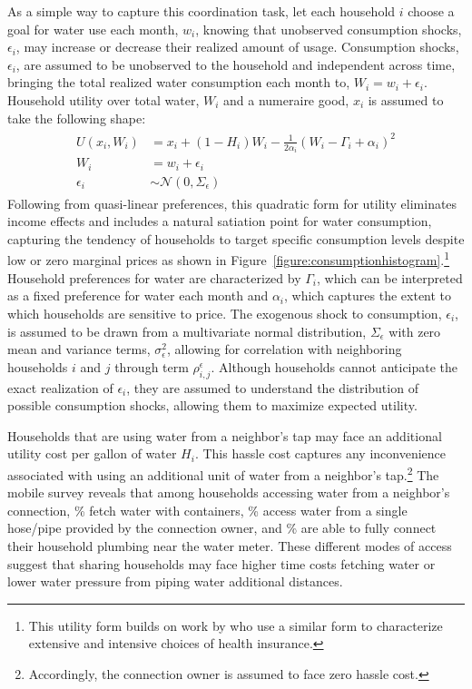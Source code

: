 \documentclass[12pt]{article}
\begin{document}
As a simple way to capture this coordination task, let each household $i$ choose a goal for water use each month, $w_i$, knowing that unobserved consumption shocks, $\epsilon_i$, may increase or decrease their realized amount of usage.  Consumption shocks, $\epsilon_i$, are assumed to be unobserved to the household and independent across time, bringing the total realized water consumption each month to, $W_i=w_i+\epsilon_i$.  Household utility over total water, $W_i$ and a numeraire good, $x_i$ is assumed to take the following shape:
\begin{align}\label{equation:umaxfirst}
\begin{split}
U(x_i,W_i) &=  x_i + (1-H_i) W_i - \frac{1}{2\alpha_i } ( W_i - \Gamma_i + \alpha_i )^2  \\
W_i &= w_i + \epsilon_i \\
\epsilon_i &\sim \mathcal{N}(0,\Sigma_{\epsilon})
\end{split}
\end{align}
Following from quasi-linear preferences, this quadratic form for utility eliminates income effects and includes a natural satiation point for water consumption, capturing the tendency of households to target specific consumption levels despite low or zero marginal prices as shown in Figure~\ref{figure:consumptionhistogram}.\footnote{This utility form builds on work by \cite{einav2013selection} who use a similar form to characterize extensive and intensive choices of health insurance.}   Household preferences for water are characterized by $\Gamma_i$, which can be interpreted as a fixed preference for water each month and $\alpha_i$, which captures the extent to which households are sensitive to price.  The exogenous shock to consumption, $\epsilon_i$, is assumed to be drawn from a multivariate normal distribution, $\Sigma_{\epsilon}$ with zero mean and variance terms, $\sigma_{\epsilon}^2$, allowing for correlation with neighboring households $i$ and $j$ through term ${\rho}^{\epsilon}_{i,j}$.  Although households cannot anticipate the exact realization of $\epsilon_i$, they are assumed to understand the distribution of possible consumption shocks, allowing them to maximize expected utility.

Households that are using water from a neighbor's tap may face an additional utility cost per gallon of water $H_i$.  This hassle cost captures any inconvenience associated with using an additional unit of water from a neighbor's tap.\footnote{Accordingly, the connection owner is assumed to face zero hassle cost.}  The mobile survey reveals that among households accessing water from a neighbor's connection, \unskip\% fetch water with containers, \unskip\% access water from a single hose/pipe provided by the connection owner, and \unskip\% are able to fully connect their household plumbing near the water meter.  These different modes of access suggest that sharing households may face higher time costs fetching water or lower water pressure from piping water additional distances.
\end{document}
